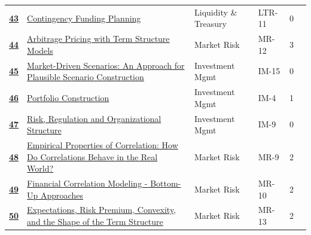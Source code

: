 \begin{longtable}{@{}r@{\hskip 7pt}L{6.35cm}@{\hskip 5pt}l@{\hskip 10pt}l@{\hskip 3pt}r@{\hskip 7pt}r@{}}
\hyperref[roi:43]{{\sffamily\bfseries\color{FRMGold}43}} & \hyperref[roi:43]{{\color{black}Contingency Funding Planning}} & {\color{FRMGrey}Liquidity \& Treasury} & {\color{FRMGrey}LTR-11} & {\color{FRMGrey}0} & \hyperref[roi:43]{{\sffamily\bfseries\color{FRMNavy}\pageref{roi:43}}} \\
\hyperref[roi:44]{{\sffamily\bfseries\color{FRMGold}44}} & \hyperref[roi:44]{{\color{black}Arbitrage Pricing with Term Structure Models}} & {\color{FRMGrey}Market Risk} & {\color{FRMGrey}MR-12} & {\color{FRMGrey}3} & \hyperref[roi:44]{{\sffamily\bfseries\color{FRMNavy}\pageref{roi:44}}} \\
\hyperref[roi:45]{{\sffamily\bfseries\color{FRMGold}45}} & \hyperref[roi:45]{{\color{black}Market-Driven Scenarios: An Approach for Plausible Scenario Construction}} & {\color{FRMGrey}Investment Mgmt} & {\color{FRMGrey}IM-15} & {\color{FRMGrey}0} & \hyperref[roi:45]{{\sffamily\bfseries\color{FRMNavy}\pageref{roi:45}}} \\
\hyperref[roi:46]{{\sffamily\bfseries\color{FRMGold}46}} & \hyperref[roi:46]{{\color{black}Portfolio Construction}} & {\color{FRMGrey}Investment Mgmt} & {\color{FRMGrey}IM-4} & {\color{FRMGrey}1} & \hyperref[roi:46]{{\sffamily\bfseries\color{FRMNavy}\pageref{roi:46}}} \\
\hyperref[roi:47]{{\sffamily\bfseries\color{FRMGold}47}} & \hyperref[roi:47]{{\color{black}Risk, Regulation and Organizational Structure}} & {\color{FRMGrey}Investment Mgmt} & {\color{FRMGrey}IM-9} & {\color{FRMGrey}0} & \hyperref[roi:47]{{\sffamily\bfseries\color{FRMNavy}\pageref{roi:47}}} \\
\hyperref[roi:48]{{\sffamily\bfseries\color{FRMGold}48}} & \hyperref[roi:48]{{\color{black}Empirical Properties of Correlation: How Do Correlations Behave in the Real World?}} & {\color{FRMGrey}Market Risk} & {\color{FRMGrey}MR-9} & {\color{FRMGrey}2} & \hyperref[roi:48]{{\sffamily\bfseries\color{FRMNavy}\pageref{roi:48}}} \\
\hyperref[roi:49]{{\sffamily\bfseries\color{FRMGold}49}} & \hyperref[roi:49]{{\color{black}Financial Correlation Modeling - Bottom-Up Approaches}} & {\color{FRMGrey}Market Risk} & {\color{FRMGrey}MR-10} & {\color{FRMGrey}2} & \hyperref[roi:49]{{\sffamily\bfseries\color{FRMNavy}\pageref{roi:49}}} \\
\hyperref[roi:50]{{\sffamily\bfseries\color{FRMGold}50}} & \hyperref[roi:50]{{\color{black}Expectations, Risk Premium, Convexity, and the Shape of the Term Structure}} & {\color{FRMGrey}Market Risk} & {\color{FRMGrey}MR-13} & {\color{FRMGrey}2} & \hyperref[roi:50]{{\sffamily\bfseries\color{FRMNavy}\pageref{roi:50}}} \\

\end{longtable}
